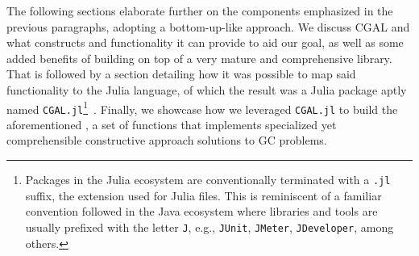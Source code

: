 The following sections elaborate further on the components emphasized in the
previous paragraphs, adopting a bottom-up-like approach.  We discuss \ac{CGAL}
and what constructs and functionality it can provide to aid our goal, as well as
some added benefits of building on top of a very mature and comprehensive
library.  That is followed by a section detailing how it was possible to map
said functionality to the Julia language, of which the result was a Julia
package aptly named \texttt{CGAL.jl}\footnote{Packages in the Julia ecosystem
are conventionally terminated with a \texttt{.jl} suffix, the extension used for
Julia files.  This is reminiscent of a familiar convention followed in the Java
ecosystem where libraries and tools are usually prefixed with the letter
\texttt{J}, e.g., \texttt{JUnit}, \texttt{JMeter}, \texttt{JDeveloper}, among
others.}~\cite{Ventura:2021:CGAL.jl}.  Finally, we showcase how we leveraged
\texttt{CGAL.jl} to build the aforementioned \primitives{}, a set of functions
that implements specialized yet comprehensible constructive approach solutions
to \ac{GC} problems.





